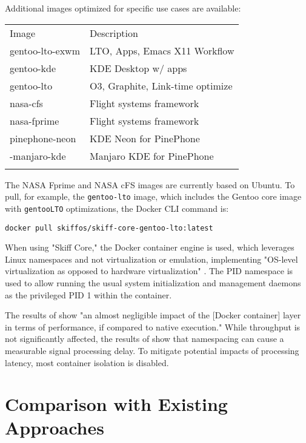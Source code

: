 \documentclass[english,]{IEEEtran}
\let\endhead\relax
\begin{document}
Additional images optimized for specific use cases are available:

\begin{longtable}[]{@{}ll@{}}
\toprule
Image & Description \\ \addlinespace
\midrule
\endhead
gentoo-lto-exwm & LTO, Apps, Emacs X11 Workflow \\ \addlinespace
gentoo-kde & KDE Desktop w/ apps \\ \addlinespace
gentoo-lto & O3, Graphite, Link-time optimize \\ \addlinespace
nasa-cfs & Flight systems framework \\ \addlinespace
nasa-fprime & Flight systems framework \\ \addlinespace
pinephone-neon & KDE Neon for PinePhone \\ \addlinespace
-manjaro-kde & Manjaro KDE for PinePhone \\ \addlinespace
\bottomrule
\end{longtable}

The NASA Fprime\autocite{fprime} and NASA cFS\autocite{nasacfs} images
are currently based on Ubuntu. To pull, for example, the
\texttt{gentoo-lto} image, which includes the Gentoo core image with
\texttt{gentooLTO} optimizations, the Docker CLI command is:

\texttt{docker\ pull\ skiffos/skiff-core-gentoo-lto:latest}

When using "Skiff Core," the Docker container engine is used, which
leverages Linux namespaces and not virtualization or emulation,
implementing "OS-level virtualization as opposed to hardware
virtualization" \autocite{virtperf}. The PID namespace is used to allow
running the usual system initialization and management daemons as the
privileged PID 1 within the container.

The results of \autocite{iotcontainer} show "an almost negligible impact
of the {[}Docker container{]} layer in terms of performance, if compared
to native execution." While throughput is not significantly affected,
the results of \autocite{autoveh} show that namespacing can cause a
measurable signal processing delay. To mitigate potential impacts of
processing latency, most container isolation is disabled.

\hypertarget{comparison-with-existing-approaches}{%
\section{Comparison with Existing
Approaches}\label{comparison-with-existing-approaches}}
\end{document}
